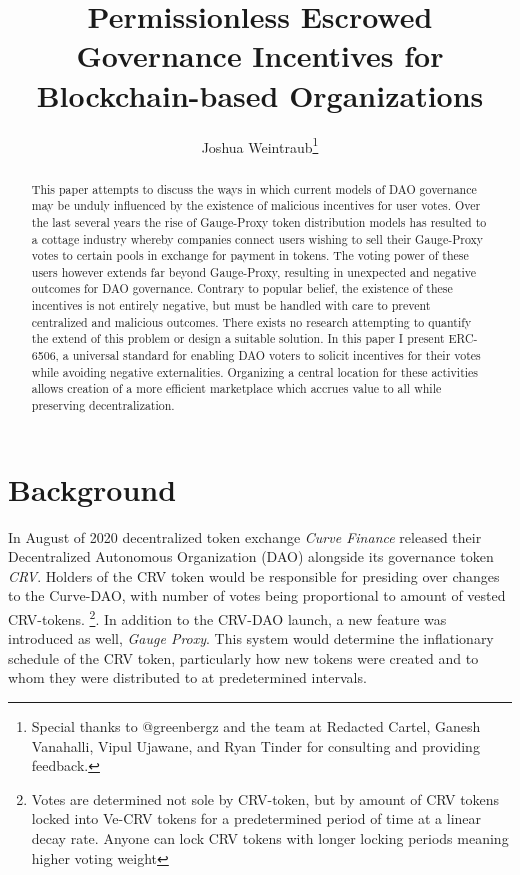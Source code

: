 \documentclass{article}
\begin{document}
\title{Permissionless Escrowed Governance Incentives for Blockchain-based Organizations}

\author{
Joshua Weintraub\thanks{Special thanks to @greenbergz and the team at Redacted Cartel, Ganesh Vanahalli, Vipul Ujawane, and Ryan Tinder for consulting and providing feedback.}
}


\maketitle

\begin{abstract}

This paper attempts to discuss the ways in which current models of DAO governance may be unduly influenced by the existence of malicious incentives for user votes. Over the last several years the rise of Gauge-Proxy token distribution models has resulted to a cottage industry whereby companies connect users wishing to sell their Gauge-Proxy votes to certain pools in exchange for payment in tokens. The voting power of these users however extends far beyond Gauge-Proxy, resulting in unexpected and negative outcomes for DAO governance. Contrary to popular belief, the existence of these incentives is not entirely negative, but must be handled with care to prevent centralized and malicious outcomes. There exists no research attempting to quantify the extend of this problem or design a suitable solution. In this paper I present ERC-6506, a universal standard for enabling DAO voters to solicit incentives for their votes while avoiding negative externalities. Organizing a central location for these activities allows creation of a more efficient marketplace which accrues value to all while preserving decentralization.


\end{abstract}

\tableofcontents



\section{Background}

In August of 2020 decentralized token exchange \emph{Curve Finance} released their Decentralized Autonomous Organization (DAO) alongside its governance token \emph{CRV}. Holders of the CRV token would be responsible for presiding over changes to the Curve-DAO, with number of votes being proportional to amount of vested CRV-tokens. \footnote{Votes are determined not sole by CRV-token, but by amount of CRV tokens locked into Ve-CRV tokens for a predetermined period of time at a linear decay rate. Anyone can lock CRV tokens with longer locking periods meaning higher voting weight}. In addition to the CRV-DAO launch, a new feature was introduced as well, \emph{Gauge Proxy}. This system would determine the inflationary schedule of the CRV token, particularly how new tokens were created and to whom they were distributed to at predetermined intervals.
\end{document}
